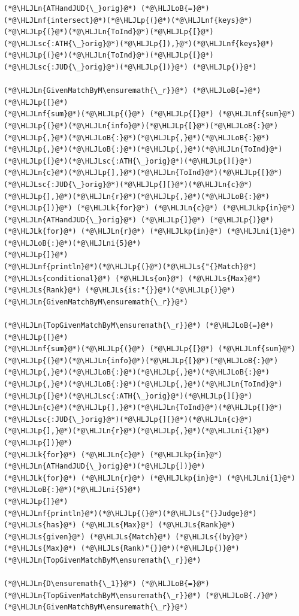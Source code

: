\documentclass[12pt,a4paper]{article}
\newcommand{\HLJLk}[1]{\textcolor[RGB]{148,91,176}{\textbf{#1}}}
\newcommand{\HLJLkp}[1]{\textcolor[RGB]{148,91,176}{\textbf{#1}}}
\newcommand{\HLJLn}[1]{#1}
\newcommand{\HLJLnf}[1]{\textcolor[RGB]{66,102,213}{#1}}
\newcommand{\HLJLs}[1]{\textcolor[RGB]{201,61,57}{#1}}
\newcommand{\HLJLsc}[1]{\textcolor[RGB]{201,61,57}{#1}}
\newcommand{\HLJLni}[1]{\textcolor[RGB]{59,151,46}{#1}}
\newcommand{\HLJLoB}[1]{\textcolor[RGB]{102,102,102}{\textbf{#1}}}
\newcommand{\HLJLp}[1]{#1}
\begin{document}
\begin{lstlisting}
(*@\HLJLn{ATHandJUD{\_}orig}@*) (*@\HLJLoB{=}@*) (*@\HLJLnf{intersect}@*)(*@\HLJLp{(}@*)(*@\HLJLnf{keys}@*)(*@\HLJLp{(}@*)(*@\HLJLn{ToInd}@*)(*@\HLJLp{[}@*)(*@\HLJLsc{:ATH{\_}orig}@*)(*@\HLJLp{]),}@*)(*@\HLJLnf{keys}@*)(*@\HLJLp{(}@*)(*@\HLJLn{ToInd}@*)(*@\HLJLp{[}@*)(*@\HLJLsc{:JUD{\_}orig}@*)(*@\HLJLp{])}@*) (*@\HLJLp{)}@*)

(*@\HLJLn{GivenMatchByM\ensuremath{\_r}}@*) (*@\HLJLoB{=}@*) (*@\HLJLp{[}@*)
(*@\HLJLnf{sum}@*)(*@\HLJLp{(}@*) (*@\HLJLp{[}@*) (*@\HLJLnf{sum}@*)(*@\HLJLp{(}@*)(*@\HLJLn{info}@*)(*@\HLJLp{[}@*)(*@\HLJLoB{:}@*)(*@\HLJLp{,}@*)(*@\HLJLoB{:}@*)(*@\HLJLp{,}@*)(*@\HLJLoB{:}@*)(*@\HLJLp{,}@*)(*@\HLJLoB{:}@*)(*@\HLJLp{,}@*)(*@\HLJLn{ToInd}@*)(*@\HLJLp{[}@*)(*@\HLJLsc{:ATH{\_}orig}@*)(*@\HLJLp{][}@*)(*@\HLJLn{c}@*)(*@\HLJLp{],}@*)(*@\HLJLn{ToInd}@*)(*@\HLJLp{[}@*)(*@\HLJLsc{:JUD{\_}orig}@*)(*@\HLJLp{][}@*)(*@\HLJLn{c}@*)(*@\HLJLp{],}@*)(*@\HLJLn{r}@*)(*@\HLJLp{,}@*)(*@\HLJLoB{:}@*)(*@\HLJLp{])}@*) (*@\HLJLk{for}@*) (*@\HLJLn{c}@*) (*@\HLJLkp{in}@*) (*@\HLJLn{ATHandJUD{\_}orig}@*) (*@\HLJLp{]}@*) (*@\HLJLp{)}@*)
(*@\HLJLk{for}@*) (*@\HLJLn{r}@*) (*@\HLJLkp{in}@*) (*@\HLJLni{1}@*)(*@\HLJLoB{:}@*)(*@\HLJLni{5}@*)
(*@\HLJLp{]}@*)
(*@\HLJLnf{println}@*)(*@\HLJLp{(}@*)(*@\HLJLs{"{}Match}@*) (*@\HLJLs{conditional}@*) (*@\HLJLs{on}@*) (*@\HLJLs{Max}@*) (*@\HLJLs{Rank}@*) (*@\HLJLs{is:"{}}@*)(*@\HLJLp{)}@*)
(*@\HLJLn{GivenMatchByM\ensuremath{\_r}}@*)

(*@\HLJLn{TopGivenMatchByM\ensuremath{\_r}}@*) (*@\HLJLoB{=}@*) (*@\HLJLp{[}@*)
(*@\HLJLnf{sum}@*)(*@\HLJLp{(}@*) (*@\HLJLp{[}@*) (*@\HLJLnf{sum}@*)(*@\HLJLp{(}@*)(*@\HLJLn{info}@*)(*@\HLJLp{[}@*)(*@\HLJLoB{:}@*)(*@\HLJLp{,}@*)(*@\HLJLoB{:}@*)(*@\HLJLp{,}@*)(*@\HLJLoB{:}@*)(*@\HLJLp{,}@*)(*@\HLJLoB{:}@*)(*@\HLJLp{,}@*)(*@\HLJLn{ToInd}@*)(*@\HLJLp{[}@*)(*@\HLJLsc{:ATH{\_}orig}@*)(*@\HLJLp{][}@*)(*@\HLJLn{c}@*)(*@\HLJLp{],}@*)(*@\HLJLn{ToInd}@*)(*@\HLJLp{[}@*)(*@\HLJLsc{:JUD{\_}orig}@*)(*@\HLJLp{][}@*)(*@\HLJLn{c}@*)(*@\HLJLp{],}@*)(*@\HLJLn{r}@*)(*@\HLJLp{,}@*)(*@\HLJLni{1}@*)(*@\HLJLp{])}@*) 
(*@\HLJLk{for}@*) (*@\HLJLn{c}@*) (*@\HLJLkp{in}@*) (*@\HLJLn{ATHandJUD{\_}orig}@*)(*@\HLJLp{])}@*)
(*@\HLJLk{for}@*) (*@\HLJLn{r}@*) (*@\HLJLkp{in}@*) (*@\HLJLni{1}@*)(*@\HLJLoB{:}@*)(*@\HLJLni{5}@*)
(*@\HLJLp{]}@*)
(*@\HLJLnf{println}@*)(*@\HLJLp{(}@*)(*@\HLJLs{"{}Judge}@*) (*@\HLJLs{has}@*) (*@\HLJLs{Max}@*) (*@\HLJLs{Rank}@*) (*@\HLJLs{given}@*) (*@\HLJLs{Match}@*) (*@\HLJLs{(by}@*) (*@\HLJLs{Max}@*) (*@\HLJLs{Rank)"{}}@*)(*@\HLJLp{)}@*)
(*@\HLJLn{TopGivenMatchByM\ensuremath{\_r}}@*)

(*@\HLJLn{D\ensuremath{\_1}}@*) (*@\HLJLoB{=}@*) (*@\HLJLn{TopGivenMatchByM\ensuremath{\_r}}@*) (*@\HLJLoB{./}@*) (*@\HLJLn{GivenMatchByM\ensuremath{\_r}}@*)
\end{lstlisting}
\end{document}
